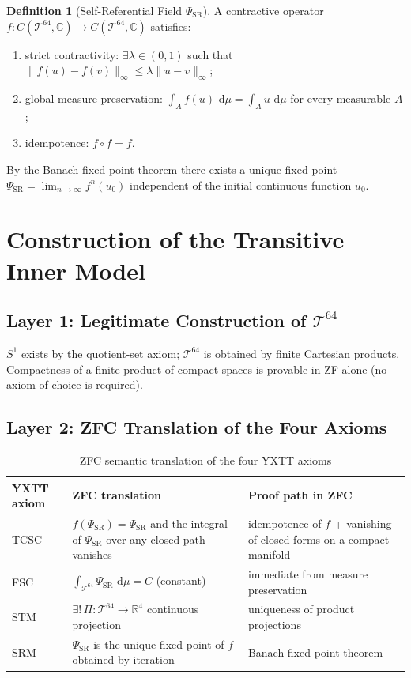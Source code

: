 \documentclass[12pt,a4paper]{article}
\newcommand{\ud}{\ensuremath{\,\mathrm{d}}}
\theoremstyle{plain}
\theoremstyle{definition}
\newtheorem{definition}[theorem]{Definition}
\newcommand{\Tsixtyfour}{\mathcal{T}^{64}}
\newcommand{\R}{\mathbb{R}}
\newcommand{\C}{\mathbb{C}}
\newcommand{\PSR}{\Psi_{\mathrm{SR}}}
\begin{document}
\begin{definition}[Self-Referential Field $\PSR$]
A contractive operator $f:C(\Tsixtyfour,\C)\to C(\Tsixtyfour,\C)$ satisfies:
\begin{enumerate}
  \item strict contractivity: $\exists\lambda\in(0,1)$ such that $\|f(u)-f(v)\|_\infty\le\lambda\|u-v\|_\infty$;
  \item global measure preservation: $\int_A f(u)\,\ud\mu=\int_A u\,\ud\mu$ for every measurable $A$;
  \item idempotence: $f\circ f=f$.
\end{enumerate}
By the Banach fixed-point theorem there exists a unique fixed point $\PSR=\lim_{n\to\infty}f^n(u_0)$ independent of the initial continuous function $u_0$.
\end{definition}

\section{Construction of the Transitive Inner Model}
\label{sec:construction}

\subsection{Layer 1: Legitimate Construction of $\Tsixtyfour$}
$S^1$ exists by the quotient-set axiom; $\Tsixtyfour$ is obtained by finite Cartesian products. Compactness of a finite product of compact spaces is provable in ZF alone (no axiom of choice is required).

\subsection{Layer 2: ZFC Translation of the Four Axioms}
\begin{table}[H]
\centering
\caption{ZFC semantic translation of the four YXTT axioms}
\label{tab:axioms_zfc}
\begin{tabular}{@{}p{2.2cm}p{5.5cm}p{6.5cm}@{}}
\toprule
\textbf{YXTT axiom} & \textbf{ZFC translation} & \textbf{Proof path in ZFC} \\
\midrule
TCSC & $f(\PSR)=\PSR$ and the integral of $\PSR$ over any closed path vanishes & idempotence of $f$ + vanishing of closed forms on a compact manifold \\
FSC & $\int_{\Tsixtyfour}\PSR\,\ud\mu=C$ (constant) & immediate from measure preservation \\
STM & $\exists!\,\Pi:\Tsixtyfour\to\R^4$ continuous projection & uniqueness of product projections \\
SRM & $\PSR$ is the unique fixed point of $f$ obtained by iteration & Banach fixed-point theorem \\
\bottomrule
\end{tabular}
\end{table}
\end{document}
